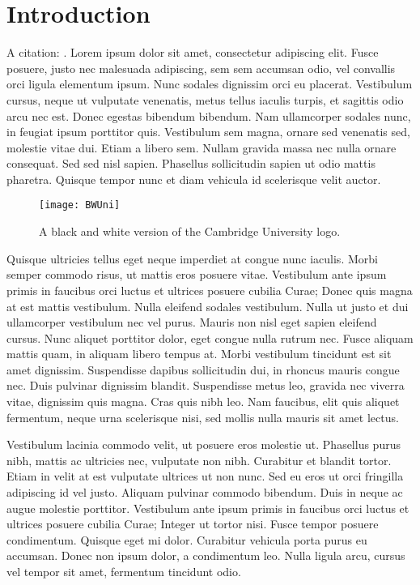 \chapter{Introduction}

A citation: \cite{example}. Lorem ipsum dolor sit amet, consectetur adipiscing elit. Fusce posuere, justo nec malesuada adipiscing, sem sem accumsan odio, vel convallis orci ligula elementum ipsum. Nunc sodales dignissim orci eu placerat. Vestibulum cursus, neque ut vulputate venenatis, metus tellus iaculis turpis, et sagittis odio arcu nec est. Donec egestas bibendum bibendum. Nam ullamcorper sodales nunc, in feugiat ipsum porttitor quis. Vestibulum sem magna, ornare sed venenatis sed, molestie vitae dui. Etiam a libero sem. Nullam gravida massa nec nulla ornare consequat. Sed sed nisl sapien. Phasellus sollicitudin sapien ut odio mattis pharetra. Quisque tempor nunc et diam vehicula id scelerisque velit auctor.

\begin{figure}[ht]
    \centering
    \texttt{[image: BWUni]}
    \caption[Cambridge University BW Logo]{A black and white version of the Cambridge University logo.}
    \label{fig:bwUniLogo}
\end{figure}

Quisque ultricies tellus eget neque imperdiet at congue nunc iaculis. Morbi semper commodo risus, ut mattis eros posuere vitae. Vestibulum ante ipsum primis in faucibus orci luctus et ultrices posuere cubilia Curae; Donec quis magna at est mattis vestibulum. Nulla eleifend sodales vestibulum. Nulla ut justo et dui ullamcorper vestibulum nec vel purus. Mauris non nisl eget sapien eleifend cursus. Nunc aliquet porttitor dolor, eget congue nulla rutrum nec. Fusce aliquam mattis quam, in aliquam libero tempus at. Morbi vestibulum tincidunt est sit amet dignissim. Suspendisse dapibus sollicitudin dui, in rhoncus mauris congue nec. Duis pulvinar dignissim blandit. Suspendisse metus leo, gravida nec viverra vitae, dignissim quis magna. Cras quis nibh leo. Nam faucibus, elit quis aliquet fermentum, neque urna scelerisque nisi, sed mollis nulla mauris sit amet lectus.

Vestibulum lacinia commodo velit, ut posuere eros molestie ut. Phasellus purus nibh, mattis ac ultricies nec, vulputate non nibh. Curabitur et blandit tortor. Etiam in velit at est vulputate ultrices ut non nunc. Sed eu eros ut orci fringilla adipiscing id vel justo. Aliquam pulvinar commodo bibendum. Duis in neque ac augue molestie porttitor. Vestibulum ante ipsum primis in faucibus orci luctus et ultrices posuere cubilia Curae; Integer ut tortor nisi. Fusce tempor posuere condimentum. Quisque eget mi dolor. Curabitur vehicula porta purus eu accumsan. Donec non ipsum dolor, a condimentum leo. Nulla ligula arcu, cursus vel tempor sit amet, fermentum tincidunt odio.

